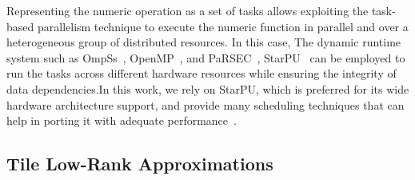 \documentclass[conference]{IEEEtran}
\begin{document}
Representing the numeric operation as a set of tasks allows exploiting the task-based parallelism technique to execute the numeric function in parallel and over a heterogeneous group of distributed resources. In this case, 
The dynamic runtime system such as  OmpSs~\cite{duran2011ompss}, OpenMP~\cite{chandra2001parallel},  and PaRSEC~\cite{bosilca2012dague},  StarPU~\cite{augonnet2011starpu} can be employed to run the tasks across different hardware resources while ensuring the integrity of data dependencies.In this work, we rely on StarPU, which is preferred for its wide hardware architecture support, and provide many scheduling techniques that can help in porting it with adequate performance~\cite{tzanos2020applying}.

\subsection{Tile Low-Rank Approximations}

\end{document}
